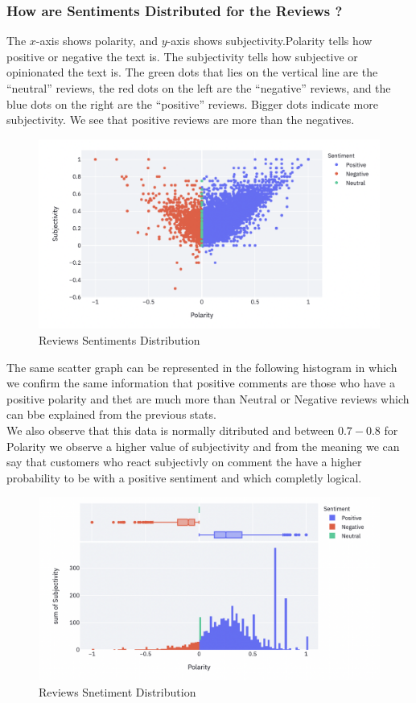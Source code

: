 \documentclass{article}
\begin{document}
\subsubsection{How are Sentiments Distributed for the Reviews ? }
The $x$-axis shows polarity, and $y$-axis shows subjectivity.Polarity tells how positive or negative the text is. The subjectivity tells how subjective or opinionated the text is. The green dots that lies on the vertical line are the “neutral” reviews, the red dots on the left are the “negative” reviews, and the blue dots on the right are the “positive” reviews. Bigger dots indicate more subjectivity. We see that positive reviews are more than the negatives.
\begin{figure}[H]
    \centering
    \includegraphics[scale=0.55]{src/img/polarity_subj_1.png}
    \caption{Reviews Sentiments Distribution}
    \label{fig:my_label}
\end{figure}

The same scatter graph can be represented in the following histogram in which we confirm the same information that positive comments are those who have a positive polarity and thet are much more than Neutral or Negative reviews which can bbe explained from the previous stats.\\
We also observe that this data is normally ditributed and between $0.7 - 0.8$ for Polarity we observe a higher value of subjectivity and from the meaning we can say that customers who react subjectivly on comment the have a higher probability to be with a positive sentiment and which completly logical.

\begin{figure}[H]
    \centering
    \includegraphics[scale=0.55]{src/img/polarity_subj_2.png}
    \caption{Reviews Snetiment Distribution}
    \label{fig:my_label}
\end{figure}
\end{document}

